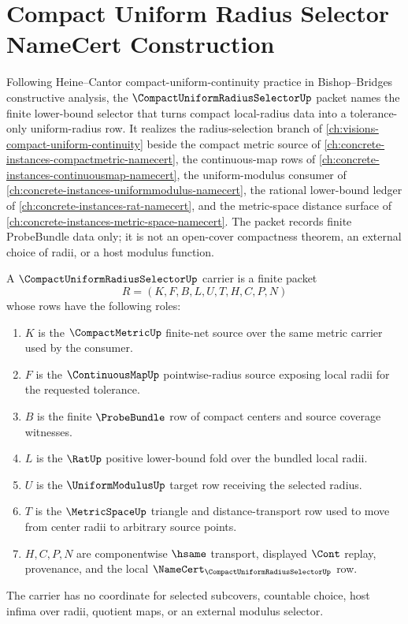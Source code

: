 \chapter{Compact Uniform Radius Selector NameCert Construction}
\label{ch:concrete-instances-compact-uniform-radius-selector-namecert}

Following Heine--Cantor compact-uniform-continuity practice in Bishop--Bridges constructive analysis, the $\CompactUniformRadiusSelectorUp$ packet names the finite lower-bound selector that turns compact local-radius data into a tolerance-only uniform-radius row. It realizes the radius-selection branch of \autoref{ch:visions-compact-uniform-continuity} beside the compact metric source of \autoref{ch:concrete-instances-compactmetric-namecert}, the continuous-map rows of \autoref{ch:concrete-instances-continuousmap-namecert}, the uniform-modulus consumer of \autoref{ch:concrete-instances-uniformmodulus-namecert}, the rational lower-bound ledger of \autoref{ch:concrete-instances-rat-namecert}, and the metric-space distance surface of \autoref{ch:concrete-instances-metric-space-namecert}. The packet records finite ProbeBundle data only; it is not an open-cover compactness theorem, an external choice of radii, or a host modulus function.

\begin{definition}
\label{def:compact-uniform-radius-selector-carrier}
A $\CompactUniformRadiusSelectorUp$ carrier is a finite packet
$$
R=(K,F,B,L,U,T,H,C,P,N)
$$
whose rows have the following roles:
\begin{enumerate}
\item $K$ is the $\CompactMetricUp$ finite-net source over the same metric carrier used by the consumer.
\item $F$ is the $\ContinuousMapUp$ pointwise-radius source exposing local radii for the requested tolerance.
\item $B$ is the finite $\ProbeBundle$ row of compact centers and source coverage witnesses.
\item $L$ is the $\RatUp$ positive lower-bound fold over the bundled local radii.
\item $U$ is the $\UniformModulusUp$ target row receiving the selected radius.
\item $T$ is the $\MetricSpaceUp$ triangle and distance-transport row used to move from center radii to arbitrary source points.
\item $H,C,P,N$ are componentwise $\hsame$ transport, displayed $\Cont$ replay, provenance, and the local $\NameCert_{\CompactUniformRadiusSelectorUp}$ row.
\end{enumerate}
The carrier has no coordinate for selected subcovers, countable choice, host infima over radii, quotient maps, or an external modulus selector.
\end{definition}

